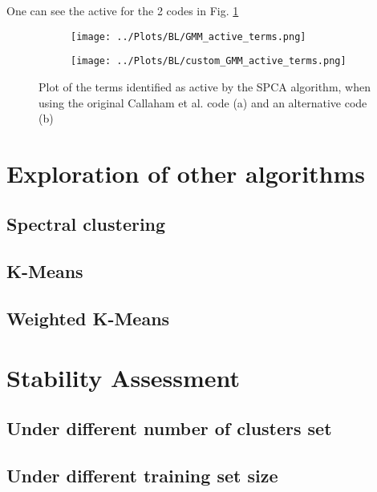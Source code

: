 \documentclass[12pt]{report} %
\begin{document}
One can see the active for the 2 codes in Fig. \ref{fig:active_terms}


\begin{figure}[htbp]
  \centering
  \begin{subfigure}[b]{0.45\textwidth}
      \texttt{[image: ../Plots/BL/GMM\_active\_terms.png]}
      \caption{}
  \end{subfigure}
  \hfill
  \begin{subfigure}[b]{0.45\textwidth}
      \texttt{[image: ../Plots/BL/custom\_GMM\_active\_terms.png]}
      \caption{}
  \end{subfigure}

  \caption{Plot of the terms identified as active by the SPCA algorithm, when using the original Callaham et al. code (a) and an alternative code (b)}

\label{fig:active_terms}
\end{figure}


\section{Exploration of other algorithms}

\subsection{Spectral clustering}

\subsection{K-Means}

\subsection{Weighted K-Means}

\section{Stability Assessment}

\subsection{Under different number of clusters set}

\subsection{Under different training set size}
\end{document}

